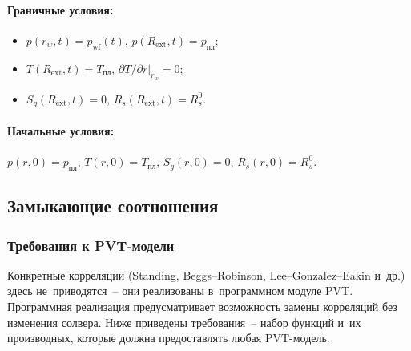 \documentclass[12pt,a4paper]{article}
\newcommand{\rw}{r_w}
\newcommand{\Rext}{R_{\mathrm{ext}}}
\newcommand{\ppl}{p_{\text{пл}}}
\newcommand{\pwf}{p_{\mathrm{wf}}}
\newcommand{\Tpl}{T_{\text{пл}}}
\begin{document}
\paragraph{Граничные условия:}
\begin{itemize}[nosep]
  \item $p(\rw,t) = \pwf(t)$, \quad $p(\Rext,t) = \ppl$;
  \item $T(\Rext,t) = \Tpl$, \quad
        $\partial T/\partial r\big|_{\rw} = 0$;
  \item $S_g(\Rext,t) = 0$, \quad $R_s(\Rext,t) = R_s^0$.
\end{itemize}

\paragraph{Начальные условия:}
$p(r,0) = \ppl$, \quad $T(r,0) = \Tpl$, \quad
$S_g(r,0) = 0$, \quad $R_s(r,0) = R_s^0$.


\subsection{Замыкающие соотношения}\label{ssec:closures}

\subsubsection{Требования к PVT-модели}

Конкретные корреляции (Standing, Beggs--Robinson, Lee--Gonzalez--Eakin
и~др.) здесь не~приводятся~-- они реализованы в~программном модуле PVT.
Программная реализация предусматривает возможность замены корреляций
без изменения солвера. Ниже приведены требования~-- набор функций
и~их производных, которые должна предоставлять любая PVT-модель.
\end{document}
